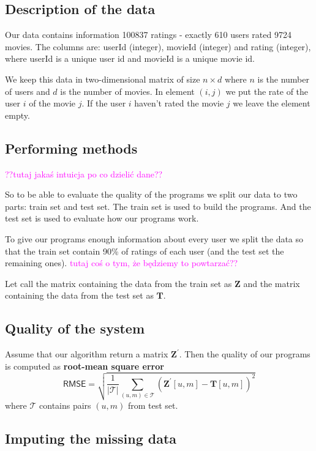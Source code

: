 \documentclass[11pt]{amsart}
\newcommand{\tami}[1]{{\textcolor{magenta}{#1}}}
\begin{document}
\subsection*{Description of the data}

Our data contains information 100837 ratings - exactly 610 users rated 9724 movies.
The columns are: \textsf{userId} (integer), \textsf{movieId} (integer) and \textsf{rating} (integer), where \textsf{userId} is a unique user id and \textsf{movieId} is a unique movie id.


We keep this data in two-dimensional matrix of size $n \times d$ where $n$ is the number of users and $d$ is the number of movies.
In element $(i,j)$ we put the rate of the user $i$ of the movie $j$.
If the user $i$ haven't rated the movie $j$ we leave the element empty.


\subsection*{Performing methods}

\tami{??tutaj jakaś intuicja po co dzielić dane??}

So to be able to evaluate the quality of the programs we split our data to two parts: train set and test set.
The train set is used to build the programs.
And the test set is used to evaluate how our programs work.


To give our programs enough information about every user we split the data so that the train set contain 90\% of ratings of each user (and the test set the remaining ones).
\tami{tutaj coś o tym, że będziemy to powtarzać??}

Let call the matrix containing the data from the train set as $\boldsymbol{Z}$ and the matrix containing the data from the test set as $\boldsymbol{T}$.


\subsection*{Quality of the system}

Assume that our algorithm return a matrix $\boldsymbol{Z}^{'}$.
Then the quality of our programs is computed as \textbf{root-mean square error}
\[\textsf{RMSE} =
\sqrt{\frac{1}{|\mathcal{T}|} \sum_{(u,m) \in \mathcal{T}} \left(\boldsymbol{Z}^{'}[u,m] - \boldsymbol{T}[u,m] \right)^2}\]
where $\mathcal{T}$ contains pairs $(u,m)$ from test set.


\subsection*{Imputing the missing data}
\end{document}
